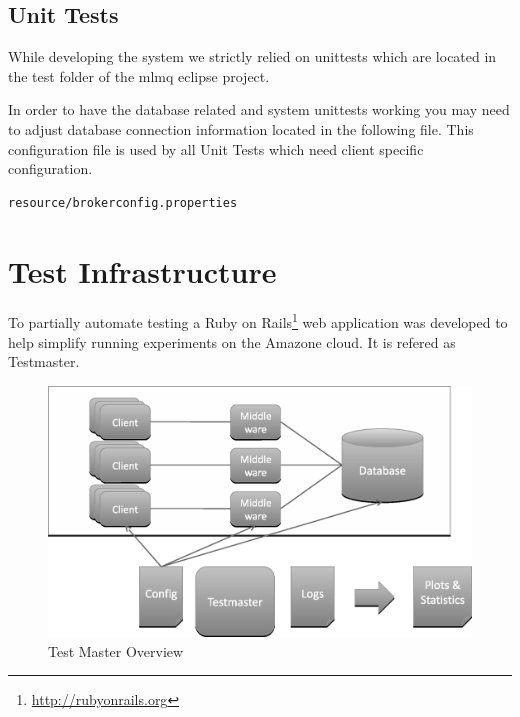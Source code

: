 \documentclass[a4paper]{article}
\begin{document}
\subsection{Unit Tests}
While developing the system we strictly relied on unittests which are located in the test folder of the mlmq eclipse project.

In order to have the database related and system unittests working you may need to adjust database connection information located in the following file. This configuration file is used by all Unit Tests which need client specific configuration.

\begin{verbatim}
resource/brokerconfig.properties
\end{verbatim}

\section{Test Infrastructure}
\label{sec:TestInfrastructure}

To partially automate testing a Ruby on Rails\footnote{\url{http://rubyonrails.org}} web application was developed to help simplify running experiments on the Amazone cloud. It is refered as Testmaster.


\begin{figure}[H]
	\begin{center}
    \includegraphics[scale=0.4]{../drawings/testsystem-overview.eps}
  \end{center}
  \caption{Test Master Overview}
  \label{fig:testmaster}
\end{figure}

\end{document}
